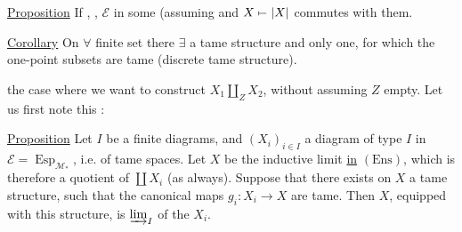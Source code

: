 \uline{Proposition} If , ,  $\mathcal E$
 in some
 (assuming  and $X\mathrel{\mapstochar\relbar}|X|$ commutes with them.

\uline{Corollary} On $\forall$ finite set there $\exists$ a tame structure and only one, for which the one-point subsets are tame (discrete tame structure).

 the case where we want to construct $X_1\amalg_Z X_2$, without assuming $Z$ empty. Let us first note this :

\uline{Proposition} Let $I$ be a finite   diagrams, and $(X_i)_{i\in I}$ a diagram of type $I$ in $\mathcal E=\operatorname{Esp}_{\mathcal M_*}$, i.e. of tame spaces. Let $X$ be the inductive limit \uline{in} $(\mathrm{Ens})$, which is therefore a  quotient of $\coprod X_i$ (as always). Suppose that there exists on $X$ a tame structure, such that the canonical maps $g_i:X_i\longrightarrow X$ are tame. Then $X$, equipped with this structure, is  $\varinjlim_I$ of the $X_i$.
